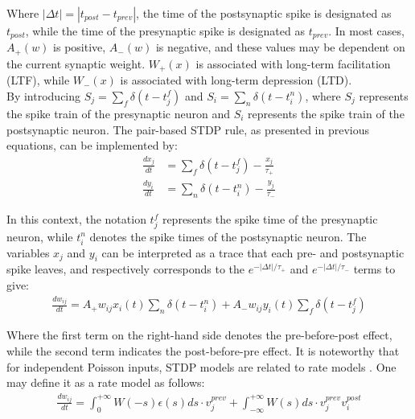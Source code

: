 \noindent Where $\left| \Delta t \right| = \left| t_{post} - t_{prev} \right|$, the time of the postsynaptic spike is designated as $t_{post}$, while the time of the presynaptic spike is designated as $t_{prev}$. In most cases, $A_+(w)$ is positive, $A_-(w)$ is negative, and these values may be dependent on the current synaptic weight. $W_+ (x)$ is associated with long-term facilitation (LTF), while $W_- (x)$ is associated with long-term depression (LTD). \\

\noindent By introducing $S_j = \sum_{f}^{} \delta\left( t - t_j^f \right) $ and $S_i = \sum_{n}^{} \delta\left( t - t_i^n \right) $,  where $S_j$ represents the spike train of the presynaptic neuron and $S_i$ represents the spike train of the postsynaptic neuron. The pair-based STDP rule, as presented in previous equations, can be implemented by:
\begin{align}
\frac{dx_j}{dt} &= \sum_{f}^{}\delta\left( t - t_j^f \right) - \frac{x_j}{\tau_+} \label{eq:4.6} \\
\frac{dy_i}{dt} &= \sum_{n}^{}\delta\left( t - t_i^n \right) - \frac{y_j}{\tau_-} \label{eq:4.7} 
\end{align}

\noindent In this context, the notation $t_j^f$ represents the spike time of the presynaptic neuron, while $t_i^n$ denotes the spike times of the postsynaptic neuron. The variables $x_j$ and $y_i$ can be interpreted as a trace that each pre- and postsynaptic spike leaves, and respectively corresponds to the $e^{-\left| \Delta t \right| / \tau_+} $ and $e^{-\left| \Delta t \right| / \tau_-}$ terms to give:
\begin{align}
\frac{dw_{ij}}{dt} = A_+ w_{ij}x_i(t) \sum_{n}\delta\left( t - t_i^n \right) + A_-w_{ij}y_i(t)\sum_{f}\delta\left( t - t_j^f \right) \label{eq:4.8} 
\end{align}

\noindent Where the first term on the right-hand side denotes the pre-before-post effect, while the second term indicates the post-before-pre effect. It is noteworthy that for independent Poisson inputs, STDP models are related to rate models \cite{gerstner2014neuronal}. One may define it as a rate model as follows:
\begin{align}
\frac{dw_{ij}}{dt} = \int_{0}^{+\infty } W(-s)\epsilon(s)ds\cdot v_{j}^{prev} + \int_{-\infty }^{+\infty } W(s)ds \cdot v_j^{prev}v_i^{post} \label{eq:4.9}
\end{align}

